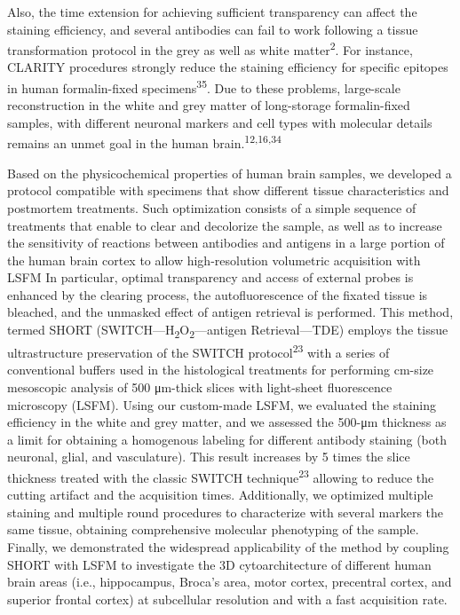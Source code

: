 \documentclass{article}
\begin{document}
Also, the time extension for achieving sufficient transparency can affect the staining efficiency, and several antibodies can fail to work following a tissue transformation protocol in the grey as well as white matter\textsuperscript{2}. For instance, CLARITY procedures strongly reduce the staining efficiency for specific epitopes in human formalin-fixed specimens\textsuperscript{35}. Due to these problems, large-scale reconstruction in the white and grey matter of long-storage formalin-fixed samples, with different neuronal markers and cell types with molecular details remains an unmet goal in the human brain.\textsuperscript{12,16,34}

Based on the physicochemical properties of human brain samples, we developed a protocol compatible with specimens that show different tissue characteristics and postmortem treatments. Such optimization consists of a simple sequence of treatments that enable to clear and decolorize the sample, as well as to increase the sensitivity of reactions between antibodies and antigens in a large portion of the human brain cortex to allow high-resolution volumetric acquisition with LSFM In particular, optimal transparency and access of external probes is enhanced by the clearing process, the autofluorescence of the fixated tissue is bleached, and the unmasked effect of antigen retrieval is performed. This method, termed SHORT (SWITCH—H\textsubscript{2}O\textsubscript{2}—antigen Retrieval—TDE) employs the tissue ultrastructure preservation of the SWITCH protocol\textsuperscript{23} with a series of conventional buffers used in the histological treatments for performing cm-size mesoscopic analysis of 500 μm-thick slices with light-sheet fluorescence microscopy (LSFM). Using our custom-made LSFM, we evaluated the staining efficiency in the white and grey matter, and we assessed the 500-μm thickness as a limit for obtaining a homogenous labeling for different antibody staining (both neuronal, glial, and vasculature). This result increases by 5 times the slice thickness treated with the classic SWITCH technique\textsuperscript{23} allowing to reduce the cutting artifact and the acquisition times. Additionally, we optimized multiple staining and multiple round procedures to characterize with several markers the same tissue, obtaining comprehensive molecular phenotyping of the sample. Finally, we demonstrated the widespread applicability of the method by coupling SHORT with LSFM to investigate the 3D cytoarchitecture of different human brain areas (i.e., hippocampus, Broca’s area, motor cortex, precentral cortex, and superior frontal cortex) at subcellular resolution and with a fast acquisition rate.
\end{document}
